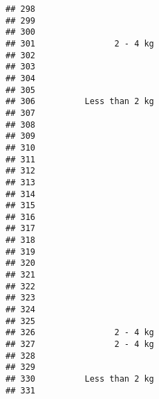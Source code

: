 \documentclass[
]{article}
\begin{document}
\begin{verbatim}
## 298                                                                       
## 299                                                                       
## 300                                                                       
## 301                2 - 4 kg                                               
## 302                                                                       
## 303                                                                       
## 304                                                                       
## 305                                                                       
## 306          Less than 2 kg                                               
## 307                                                                       
## 308                                                                       
## 309                                                                       
## 310                                                                       
## 311                                                                       
## 312                                                                       
## 313                                                                       
## 314                                                                       
## 315                                                                       
## 316                                                                       
## 317                                                                       
## 318                                                                       
## 319                                                                       
## 320                                                                       
## 321                                                                       
## 322                                                                       
## 323                                                                       
## 324                                                                       
## 325                                                                       
## 326                2 - 4 kg                                               
## 327                2 - 4 kg                                               
## 328                                                                       
## 329                                                                       
## 330          Less than 2 kg                                               
## 331                                                                       

\end{verbatim}
\end{document}
